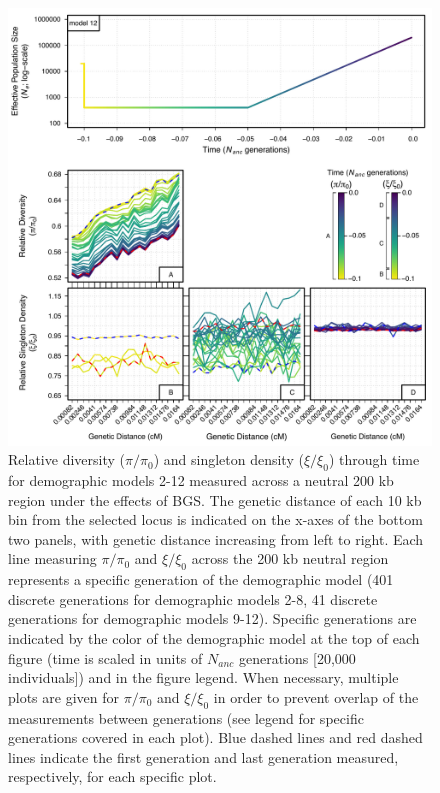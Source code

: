 \documentclass[9pt,twocolumn,twoside]{rilabRxiv}
\begin{document}
\begin{figure}[htb]
      \centering
      \includegraphics[width=\linewidth]{figures/FigS20.pdf}
      \caption{Relative diversity ($\pi/\pi_0$) and singleton density ($\xi/\xi_0$) through time for demographic models 2-12 measured across a neutral 200 kb region under the effects of BGS.
The genetic distance of each 10 kb bin from the selected locus is indicated on the x-axes of the bottom two panels, with genetic distance increasing from left to right.
Each line measuring $\pi/\pi_0$ and $\xi/\xi_0$ across the 200 kb neutral region represents a specific generation of the demographic model (401 discrete generations for demographic models 2-8, 41 discrete generations for demographic models 9-12).
Specific generations are indicated by the color of the demographic model at the top of each figure (time is scaled in units of $N_{anc}$ generations [20,000 individuals]) and in the figure legend.
When necessary, multiple plots are given for $\pi/\pi_0$ and $\xi/\xi_0$ in order to prevent overlap of the measurements between generations (see legend for specific generations covered in each plot).
Blue dashed lines and red dashed lines indicate the first generation and last generation measured, respectively, for each specific plot.}
\label{fig:all200}
\end{figure}
\pagebreak
\end{document}
